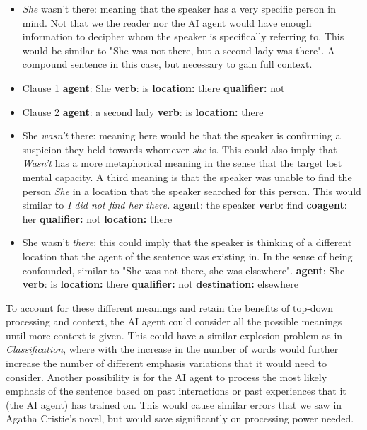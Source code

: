 \begin{itemize}
	\item \textit{She} wasn't there: meaning that the speaker has a very specific person in mind. Not that we the reader nor the AI agent would have enough information to decipher whom the speaker is specifically referring to. This would be similar to "She was not there, but a second lady was there". A compound sentence in this case, but necessary to gain full context.
	\item Clause 1
	\subitem \textbf{agent}: She
	\subitem \textbf{verb}: is
	\subitem \textbf{location:} there
	\subitem \textbf{qualifier:} not
	
	\item Clause 2
	\subitem \textbf{agent}: a second lady
	\subitem \textbf{verb}: is
	\subitem \textbf{location:} there


	\item She \textit{wasn't} there: meaning here would be that the speaker is confirming a suspicion they held towards whomever \textit{she }is. This could also imply that \textit{Wasn't} has a more metaphorical meaning in the sense that the target lost mental capacity. A third meaning is that the speaker was unable to find the person \textit{She} in a location that the speaker searched for this person. This would similar to \textit{I did not find her there.}
	\subitem \textbf{agent}: the speaker
	\subitem \textbf{verb}: find
	\subitem \textbf{coagent}: her
	\subitem \textbf{qualifier:} not
	\subitem \textbf{location:} there
	

	\item She wasn't \textit{there}: this could imply that the speaker is thinking of a different location that the agent of the sentence was existing in. In the sense of being confounded, similar to "She was not there, she was elsewhere".
	\subitem \textbf{agent}: She
	\subitem \textbf{verb}: is
	\subitem \textbf{location:} there
	\subitem \textbf{qualifier:} not
	\subitem \textbf{destination:} elsewhere

\end{itemize}



To account for these different meanings and retain the benefits of top-down processing and context, the AI agent could consider all the possible meanings until more context is given. This could have a similar explosion problem as in \textit{Classification}, where with the increase in the number of words would further increase the number of different emphasis variations that it would need to consider. Another possibility is for the AI agent to process the most likely emphasis of the sentence based on past interactions or past experiences that it (the AI agent) has trained on. This would cause similar errors that we saw in Agatha Cristie's novel, but would save significantly on processing power needed.